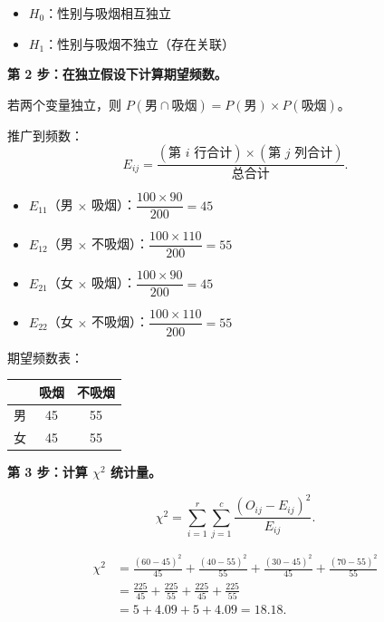 \begin{itemize}
    \item $H_0$：性别与吸烟相互独立
    \item $H_1$：性别与吸烟不独立（存在关联）
\end{itemize}

\textbf{第 2 步：在独立假设下计算期望频数。}

若两个变量独立，则 $P(\text{男} \cap \text{吸烟}) = P(\text{男}) \times P(\text{吸烟})$。

推广到频数：
\begin{equation}
    \boxed{E_{ij} = \frac{(\text{第 } i \text{ 行合计}) \times (\text{第 } j \text{ 列合计})}{\text{总合计}}}.
\end{equation}

\begin{itemize}
    \item $E_{11}$（男 $\times$ 吸烟）：$\dfrac{100 \times 90}{200} = 45$
    \item $E_{12}$（男 $\times$ 不吸烟）：$\dfrac{100 \times 110}{200} = 55$
    \item $E_{21}$（女 $\times$ 吸烟）：$\dfrac{100 \times 90}{200} = 45$
    \item $E_{22}$（女 $\times$ 不吸烟）：$\dfrac{100 \times 110}{200} = 55$
\end{itemize}

期望频数表：
\begin{center}
\begin{tabular}{c|cc}
\toprule
& 吸烟 & 不吸烟 \\
\midrule
男 & 45 & 55 \\
女 & 45 & 55 \\
\bottomrule
\end{tabular}
\end{center}

\textbf{第 3 步：计算 $\chi^2$ 统计量。}

\begin{equation}
    \chi^2 = \sum_{i=1}^{r} \sum_{j=1}^{c} \frac{(O_{ij} - E_{ij})^2}{E_{ij}}.
\end{equation}

\begin{align}
    \chi^2 &= \frac{(60-45)^2}{45} + \frac{(40-55)^2}{55} + \frac{(30-45)^2}{45} + \frac{(70-55)^2}{55} \\
          &= \frac{225}{45} + \frac{225}{55} + \frac{225}{45} + \frac{225}{55} \\
          &= 5 + 4.09 + 5 + 4.09 = 18.18.
\end{align}

